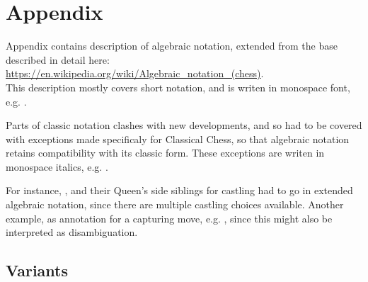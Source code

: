 

\chapter*{Appendix}
\label{ch:Appendix}

Appendix contains description of algebraic notation, extended from the base described in detail here: \\
\href{https://en.wikipedia.org/wiki/Algebraic\_notation\_(chess)}{https://en.wikipedia.org/wiki/Algebraic\_notation\_(chess)}. \\
This description mostly covers short notation, and is writen in monospace font, e.g. .

Parts of classic notation clashes with new developments, and so had to be covered with
exceptions made specificaly for Classical Chess, so that algebraic notation retains
compatibility with its classic form. These exceptions are writen in monospace italics,
e.g. .

For instance, ,  and their Queen's side siblings for castling had
to go in extended algebraic notation, since there are multiple castling choices available.
Another example,  as annotation for a capturing move, e.g. , since
this might also be interpreted as disambiguation.

\clearpage %

\section*{Variants}
\label{sec:Appendix/Variants}

